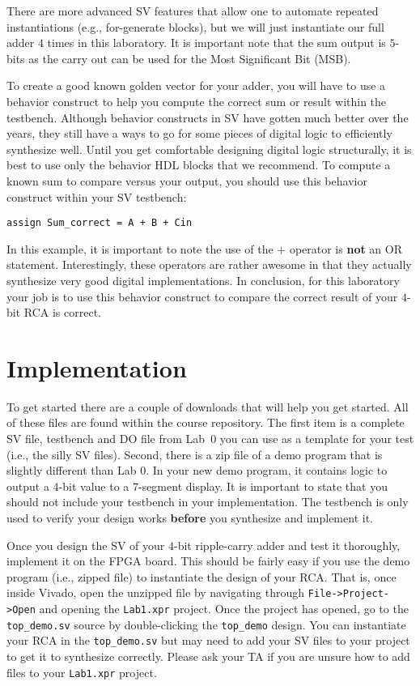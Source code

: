 \documentclass{article}
\begin{document}
There are more advanced SV features that
allow one to automate repeated instantiations (e.g., for-generate
blocks), but we will just instantiate our full adder $4$ times in this
laboratory.  It is important note that the sum output is $5$-bits as
the carry out can be used for the Most Significant Bit (MSB).

To create a good known golden vector for your adder, you will have to
use a behavior construct to help you compute the correct sum or
result within the testbench.  Although
behavior constructs in SV have gotten much better over the
years, they still have a ways to go for some pieces of digital logic
to efficiently synthesize well.
Until you get comfortable designing digital logic structurally, it is
best to use only the behavior HDL blocks that we recommend.  To compute a
known sum to compare versus your output, you should
use this behavior construct within your SV testbench:
\begin{verbatim}
assign Sum_correct = A + B + Cin
\end{verbatim}
In this example, it is important to note the use of the $+$ operator
is \textbf{not} an OR statement.  Interestingly, these operators
are rather awesome in that they actually synthesize very good
digital implementations.  In conclusion, for this laboratory your job is to use this
behavior construct to compare the correct result of your $4$-bit RCA is
correct.

\section{Implementation}

To get started there are a couple of downloads that will help you
get started.  All of these files are found within the course
repository.
The first item is a complete SV file, testbench and DO
file from Lab~$0$ you can use as a template for your test (i.e., the
silly SV files).   
Second, there is a zip
file of a demo program that is slightly different than Lab 0.  In your
new demo program, it contains logic to output a $4$-bit value to a
$7$-segment display.  
It is important to state that you should not include your testbench in
your implementation. The testbench is only used to verify your design
works \textbf{before} you synthesize and implement it.

Once you design the SV of your $4$-bit ripple-carry adder
and test it thoroughly, implement it on the
FPGA board.  This should be fairly easy if you use the demo program
(i.e., zipped file) to instantiate the design of your RCA.
That is, once inside Vivado, open the unzipped file by navigating
through \verb!File->Project->Open! and opening the \verb!Lab1.xpr!
project.  Once the project has opened, go to the \verb!top_demo.sv!
source by double-clicking the \verb!top_demo!
design.  You can instantiate your RCA in the \verb!top_demo.sv! but
may need to add your SV files to your project to get it to synthesize
correctly.
Please ask your TA if you are unsure
how to add files to your \verb!Lab1.xpr! project.
\end{document}
